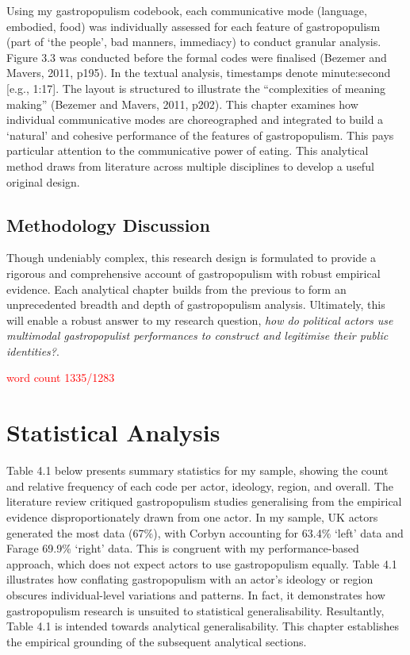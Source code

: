 \documentclass[a4paper, nobind]{templates/ociamthesis}
\begin{document}
Using my gastropopulism codebook, each communicative mode (language, embodied, food) was individually assessed for each feature of gastropopulism (part of `the people', bad manners, immediacy) to conduct granular analysis. Figure 3.3 was conducted before the formal codes were finalised (Bezemer and Mavers, 2011, p195). In the textual analysis, timestamps denote minute:second {[}e.g., 1:17{]}. The layout is structured to illustrate the ``complexities of meaning making'' (Bezemer and Mavers, 2011, p202). This chapter examines how individual communicative modes are choreographed and integrated to build a `natural' and cohesive performance of the features of gastropopulism. This pays particular attention to the communicative power of eating. This analytical method draws from literature across multiple disciplines to develop a useful original design.

\hypertarget{methodology-discussion}{%
\section*{Methodology Discussion}\label{methodology-discussion}}

Though undeniably complex, this research design is formulated to provide a rigorous and comprehensive account of gastropopulism with robust empirical evidence. Each analytical chapter builds from the previous to form an unprecedented breadth and depth of gastropopulism analysis. Ultimately, this will enable a robust answer to my research question, \emph{how do political actors use multimodal gastropopulist performances to construct and legitimise their public identities?}.

\textcolor{red}{word count 1335/1283}

\hypertarget{statistical-analysis-1}{%
\chapter{Statistical Analysis}\label{statistical-analysis-1}}

Table 4.1 below presents summary statistics for my sample, showing the count and relative frequency of each code per actor, ideology, region, and overall. The literature review critiqued gastropopulism studies generalising from the empirical evidence disproportionately drawn from one actor. In my sample, UK actors generated the most data (67\%), with Corbyn accounting for 63.4\% `left' data and Farage 69.9\% `right' data. This is congruent with my performance-based approach, which does not expect actors to use gastropopulism equally. Table 4.1 illustrates how conflating gastropopulism with an actor's ideology or region obscures individual-level variations and patterns. In fact, it demonstrates how gastropopulism research is unsuited to statistical generalisability. Resultantly, Table 4.1 is intended towards analytical generalisability. This chapter establishes the empirical grounding of the subsequent analytical sections.
\end{document}
